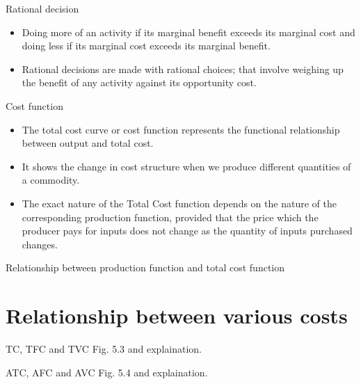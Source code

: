 \documentclass[12pt,ignorenonframetext,aspectratio=169]{beamer}
\providecommand{\tightlist}{%
  \setlength{\itemsep}{0pt}\setlength{\parskip}{0pt}}
\begin{document}
\begin{frame}{Rational decision}
\protect\hypertarget{rational-decision}{}
\begin{itemize}
\tightlist
\item
  Doing more of an activity if its marginal benefit exceeds its marginal
  cost and doing less if its marginal cost exceeds its marginal benefit.
\item
  Rational decisions are made with rational choices; that involve
  weighing up the benefit of any activity against its opportunity cost.
\end{itemize}
\end{frame}

\begin{frame}{Cost function}
\protect\hypertarget{cost-function}{}
\begin{itemize}
\tightlist
\item
  The total cost curve or cost function represents the functional
  relationship between output and total cost.
\item
  It shows the change in cost structure when we produce different
  quantities of a commodity.
\item
  The exact nature of the Total Cost function depends on the nature of
  the corresponding production function, provided that the price which
  the producer pays for inputs does not change as the quantity of inputs
  purchased changes.
\end{itemize}
\end{frame}

\begin{frame}{Relationship between production function and total cost
function}
\protect\hypertarget{relationship-between-production-function-and-total-cost-function}{}
\end{frame}

\hypertarget{relationship-between-various-costs}{%
\section{Relationship between various
costs}\label{relationship-between-various-costs}}

\begin{frame}{TC, TFC and TVC}
\protect\hypertarget{tc-tfc-and-tvc}{}
Fig. 5.3 and explaination.
\end{frame}

\begin{frame}{ATC, AFC and AVC}
\protect\hypertarget{atc-afc-and-avc}{}
Fig. 5.4 and explaination.
\end{frame}
\end{document}
